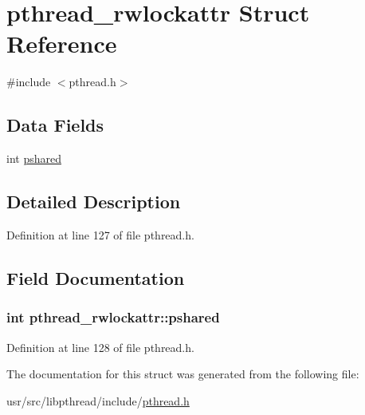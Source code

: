 \hypertarget{structpthread__rwlockattr}{\section{pthread\+\_\+rwlockattr Struct Reference}
\label{structpthread__rwlockattr}
}


{\ttfamily \#include $<$pthread.\+h$>$}

\subsection*{Data Fields}
\begin{DoxyCompactItemize}
\item 
int \hyperlink{structpthread__rwlockattr_a8a113eba0407c92f6302fada4c4d7419}{pshared}
\end{DoxyCompactItemize}


\subsection{Detailed Description}


Definition at line 127 of file pthread.\+h.



\subsection{Field Documentation}
\hypertarget{structpthread__rwlockattr_a8a113eba0407c92f6302fada4c4d7419}{
\subsubsection[{pshared}]{\setlength{\rightskip}{0pt plus 5cm}int pthread\+\_\+rwlockattr\+::pshared}}\label{structpthread__rwlockattr_a8a113eba0407c92f6302fada4c4d7419}


Definition at line 128 of file pthread.\+h.



The documentation for this struct was generated from the following file\+:\begin{DoxyCompactItemize}
\item 
usr/src/libpthread/include/\hyperlink{pthread_8h}{pthread.\+h}\end{DoxyCompactItemize}
